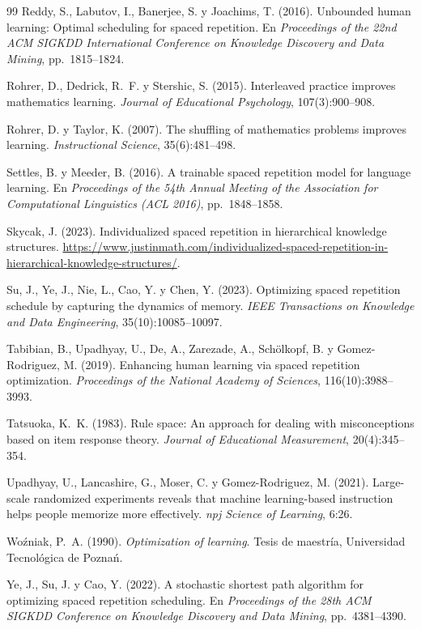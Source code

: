 \begin{thebibliography}{99}
Reddy, S., Labutov, I., Banerjee, S. y Joachims, T. (2016).
\newblock Unbounded human learning: Optimal scheduling for spaced repetition.
\newblock En \emph{Proceedings of the 22nd ACM SIGKDD International Conference on Knowledge Discovery and Data Mining}, pp.~1815--1824.

Rohrer, D., Dedrick, R.~F. y Stershic, S. (2015).
\newblock Interleaved practice improves mathematics learning.
\newblock \emph{Journal of Educational Psychology}, 107(3):900--908.

Rohrer, D. y Taylor, K. (2007).
\newblock The shuffling of mathematics problems improves learning.
\newblock \emph{Instructional Science}, 35(6):481--498.

Settles, B. y Meeder, B. (2016).
\newblock A trainable spaced repetition model for language learning.
\newblock En \emph{Proceedings of the 54th Annual Meeting of the Association for Computational Linguistics (ACL 2016)}, pp.~1848--1858.

Skycak, J. (2023).
\newblock Individualized spaced repetition in hierarchical knowledge structures.
\newblock \url{https://www.justinmath.com/individualized-spaced-repetition-in-hierarchical-knowledge-structures/}.

Su, J., Ye, J., Nie, L., Cao, Y. y Chen, Y. (2023).
\newblock Optimizing spaced repetition schedule by capturing the dynamics of memory.
\newblock \emph{IEEE Transactions on Knowledge and Data Engineering}, 35(10):10085--10097.

Tabibian, B., Upadhyay, U., De, A., Zarezade, A., Schölkopf, B. y Gomez-Rodriguez, M. (2019).
\newblock Enhancing human learning via spaced repetition optimization.
\newblock \emph{Proceedings of the National Academy of Sciences}, 116(10):3988--3993.

Tatsuoka, K.~K. (1983).
\newblock Rule space: An approach for dealing with misconceptions based on item response theory.
\newblock \emph{Journal of Educational Measurement}, 20(4):345--354.

Upadhyay, U., Lancashire, G., Moser, C. y Gomez-Rodriguez, M. (2021).
\newblock Large-scale randomized experiments reveals that machine learning-based instruction helps people memorize more effectively.
\newblock \emph{npj Science of Learning}, 6:26.

Woźniak, P.~A. (1990).
\newblock \emph{Optimization of learning}.
\newblock Tesis de maestría, Universidad Tecnológica de Poznań.

Ye, J., Su, J. y Cao, Y. (2022).
\newblock A stochastic shortest path algorithm for optimizing spaced repetition scheduling.
\newblock En \emph{Proceedings of the 28th ACM SIGKDD Conference on Knowledge Discovery and Data Mining}, pp.~4381--4390.

\end{thebibliography}
